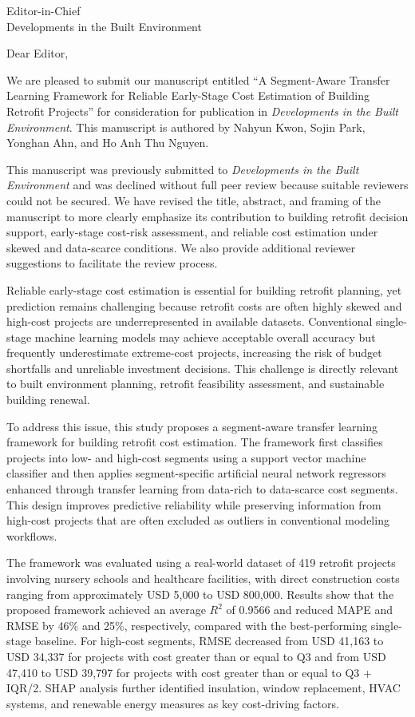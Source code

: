 \documentclass[11pt]{letter}
\date{July 2026}
\begin{document}
\begin{letter}{Editor-in-Chief\\Developments in the Built Environment}

\opening{Dear Editor,}

We are pleased to submit our manuscript entitled ``A Segment-Aware Transfer Learning Framework for Reliable Early-Stage Cost Estimation of Building Retrofit Projects'' for consideration for publication in \textit{Developments in the Built Environment}. This manuscript is authored by Nahyun Kwon, Sojin Park, Yonghan Ahn, and Ho Anh Thu Nguyen.

This manuscript was previously submitted to \textit{Developments in the Built Environment} and was declined without full peer review because suitable reviewers could not be secured. We have revised the title, abstract, and framing of the manuscript to more clearly emphasize its contribution to building retrofit decision support, early-stage cost-risk assessment, and reliable cost estimation under skewed and data-scarce conditions. We also provide additional reviewer suggestions to facilitate the review process.

Reliable early-stage cost estimation is essential for building retrofit planning, yet prediction remains challenging because retrofit costs are often highly skewed and high-cost projects are underrepresented in available datasets. Conventional single-stage machine learning models may achieve acceptable overall accuracy but frequently underestimate extreme-cost projects, increasing the risk of budget shortfalls and unreliable investment decisions. This challenge is directly relevant to built environment planning, retrofit feasibility assessment, and sustainable building renewal.

To address this issue, this study proposes a segment-aware transfer learning framework for building retrofit cost estimation. The framework first classifies projects into low- and high-cost segments using a support vector machine classifier and then applies segment-specific artificial neural network regressors enhanced through transfer learning from data-rich to data-scarce cost segments. This design improves predictive reliability while preserving information from high-cost projects that are often excluded as outliers in conventional modeling workflows.

The framework was evaluated using a real-world dataset of 419 retrofit projects involving nursery schools and healthcare facilities, with direct construction costs ranging from approximately USD 5,000 to USD 800,000. Results show that the proposed framework achieved an average \(R^2\) of 0.9566 and reduced MAPE and RMSE by 46\% and 25\%, respectively, compared with the best-performing single-stage baseline. For high-cost segments, RMSE decreased from USD 41,163 to USD 34,337 for projects with cost greater than or equal to Q3 and from USD 47,410 to USD 39,797 for projects with cost greater than or equal to Q3 + IQR/2. SHAP analysis further identified insulation, window replacement, HVAC systems, and renewable energy measures as key cost-driving factors.


\end{letter}
\end{document}
